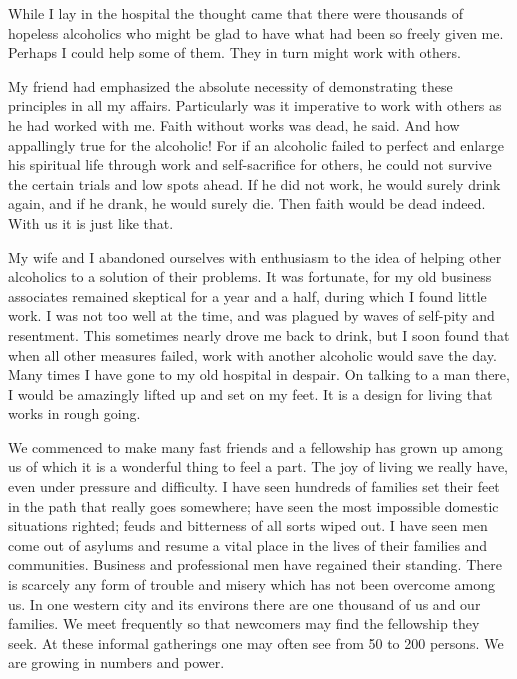 \begin{biblechapter}
    While I lay in the hospital 
    the thought came that there were thousands of hopeless alcoholics 
    who might be glad to have what had been so freely given me.
\verse Perhaps I could help some of them.
\verse They in turn might work with others.

\verse My friend had emphasized the absolute necessity 
    of demonstrating these principles in all my affairs.
\verse Particularly was it imperative to work with others 
    as he had worked with me.
\verse Faith without works was dead, he said.
\verse And how appallingly true for the alcoholic!
\verse For if an alcoholic failed to perfect and enlarge his spiritual life 
    through work and self-sacrifice for others, 
    he could not survive the certain trials and low spots ahead.
\verse If he did not work, 
    he would surely drink again, 
    and if he drank, 
    he would surely die.
\verse Then faith would be dead indeed.
\verse With us it is just like that.

\verse My wife and I abandoned ourselves with enthusiasm 
    to the idea of helping other alcoholics 
    to a solution of their problems.
\verse It was fortunate, 
    for my old business associates remained skeptical for a year and a half, 
    during which I found little work.
\verse I was not too well at the time, 
    and was plagued by waves of self-pity and resentment.
\verse This sometimes nearly drove me back to drink, 
    but I soon found that when all other measures failed, 
    work with another alcoholic would save the day.
\verse Many times I have gone to my old hospital in despair.
\verse On talking to a man there, 
    I would be amazingly lifted up and set on my feet.
\verse It is a design for living that works in rough going.

\verse We commenced to make many fast friends 
    and a fellowship has grown up among us 
    of which it is a wonderful thing to feel a part.
\verse The joy of living we really have, 
    even under pressure and difficulty.
\verse I have seen hundreds of families set their feet 
    in the path that really goes somewhere; 
    have seen the most impossible domestic situations righted; 
    feuds and bitterness of all sorts wiped out.  
\verse I have seen men come out of asylums 
    and resume a vital place in the lives of their families and communities.  
\verse Business and professional men have regained their standing.  
\verse There is scarcely any form of trouble and misery 
    which has not been overcome among us.  
\verse In one western city and its environs 
    there are one thousand of us and our families.  
\verse We meet frequently so that newcomers may find the fellowship they seek.  
\verse At these informal gatherings one may often see from 50 to 200 persons.  
\verse We are growing in numbers and power.


\end{biblechapter}
